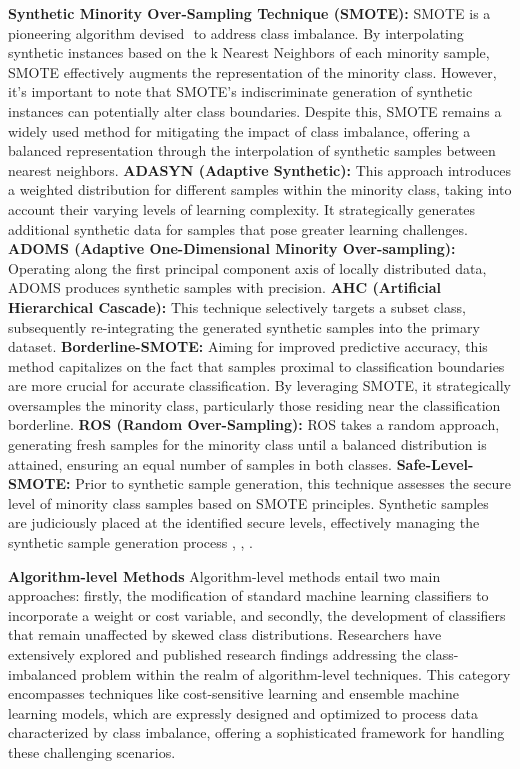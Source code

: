 \textbf{Synthetic Minority Over-Sampling Technique (SMOTE):} SMOTE is a pioneering algorithm devised \cite{Chawla2002}⁠ to address class imbalance. By interpolating synthetic instances based on the k Nearest Neighbors of each minority sample, SMOTE effectively augments the representation of the minority class. However, it's important to note that SMOTE's indiscriminate generation of synthetic instances can potentially alter class boundaries. Despite this, SMOTE remains a widely used method for mitigating the impact of class imbalance, offering a balanced representation through the interpolation of synthetic samples between nearest neighbors.
\textbf{ADASYN (Adaptive Synthetic):} This approach introduces a weighted distribution for different samples within the minority class, taking into account their varying levels of learning complexity. It strategically generates additional synthetic data for samples that pose greater learning challenges.
\textbf{ADOMS (Adaptive One-Dimensional Minority Over-sampling):} Operating along the first principal component axis of locally distributed data, ADOMS produces synthetic samples with precision.
\textbf{AHC (Artificial Hierarchical Cascade):} This technique selectively targets a subset class, subsequently re-integrating the generated synthetic samples into the primary dataset.
\textbf{Borderline-SMOTE:} Aiming for improved predictive accuracy, this method capitalizes on the fact that samples proximal to classification boundaries are more crucial for accurate classification. By leveraging SMOTE, it strategically oversamples the minority class, particularly those residing near the classification borderline.
\textbf{ROS (Random Over-Sampling):} ROS takes a random approach, generating fresh samples for the minority class until a balanced distribution is attained, ensuring an equal number of samples in both classes.
\textbf{Safe-Level-SMOTE:} Prior to synthetic sample generation, this technique assesses the secure level of minority class samples based on SMOTE principles. Synthetic samples are judiciously placed at the identified secure levels, effectively managing the synthetic sample generation process \cite{Tarawneh2020}, \cite{Fotouhi2019}, \cite{Khushi2021}⁠. 

\textbf{Algorithm-level Methods} 
Algorithm-level methods entail two main approaches: firstly, the modification of standard machine learning classifiers to incorporate a weight or cost variable, and secondly, the development of classifiers that remain unaffected by skewed class distributions. Researchers have extensively explored and published research findings addressing the class-imbalanced problem within the realm of algorithm-level techniques. This category encompasses techniques like cost-sensitive learning and ensemble machine learning models, which are expressly designed and optimized to process data characterized by class imbalance, offering a sophisticated framework for handling these challenging scenarios.


